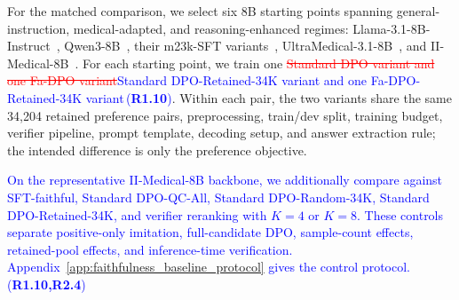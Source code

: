 \documentclass[a4paper,fleqn,doubleblind]{cas-sc}
\DeclareRobustCommand{\deleted}[1]{\textcolor{red}{\sout{#1}}}
\DeclareRobustCommand{\added}[1]{\textcolor{blue}{#1}}
\DeclareRobustCommand{\revtag}[1]{\textcolor{blue}{\scriptsize\,(\textbf{#1})}}
\begin{document}
For the matched comparison, we select six 8B starting points spanning general-instruction, medical-adapted, and reasoning-enhanced regimes: Llama-3.1-8B-Instruct~\cite{dubey2024llama}, Qwen3-8B~\cite{yang2025qwen3}, their m23k-SFT variants~\cite{huang2025m1}, UltraMedical-3.1-8B~\cite{zhang2024ultramedical}, and II-Medical-8B~\cite{intelligentinternet2025iimedical8b}. For each starting point, we train one \deleted{Standard DPO variant and one Fa-DPO variant}\added{Standard DPO-Retained-34K variant and one Fa-DPO-Retained-34K variant}\revtag{R1.10}. Within each pair, the two variants share the same 34,204 retained preference pairs, preprocessing, train/dev split, training budget, verifier pipeline, prompt template, decoding setup, and answer extraction rule; the intended difference is only the preference objective.

\added{On the representative II-Medical-8B backbone, we additionally compare against SFT-faithful, Standard DPO-QC-All, Standard DPO-Random-34K, Standard DPO-Retained-34K, and verifier reranking with $K=4$ or $K=8$. These controls separate positive-only imitation, full-candidate DPO, sample-count effects, retained-pool effects, and inference-time verification. Appendix~\ref{app:faithfulness_baseline_protocol} gives the control protocol.}\revtag{R1.10,R2.4}
\end{document}
